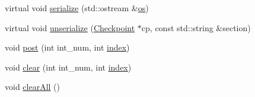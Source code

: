 \begin{DoxyCompactItemize}
\item 
virtual void \hyperlink{classX86ISA_1_1Interrupts_a53e036786d17361be4c7320d39c99b84}{serialize} (std::ostream \&\hyperlink{namespaceX86ISA_a6b6e6ba763e7eaf46ac5b6372ca98d30}{os})
\item 
virtual void \hyperlink{classX86ISA_1_1Interrupts_af22e5d6d660b97db37003ac61ac4ee49}{unserialize} (\hyperlink{classCheckpoint}{Checkpoint} $\ast$cp, const std::string \&section)
\item 
void \hyperlink{classX86ISA_1_1Interrupts_a24c6c4fbdc0605bcd015ce06f194e4b4}{post} (int int\_\-num, int \hyperlink{namespaceX86ISA_aa7f971ede8ba06dbd8a605007eda1c6f}{index})
\item 
void \hyperlink{classX86ISA_1_1Interrupts_af60c3484087379d0330467d77f6cbaae}{clear} (int int\_\-num, int \hyperlink{namespaceX86ISA_aa7f971ede8ba06dbd8a605007eda1c6f}{index})
\item 
void \hyperlink{classX86ISA_1_1Interrupts_a798729dca95209ecdc609807a653a2bf}{clearAll} ()
\end{DoxyCompactItemize}
